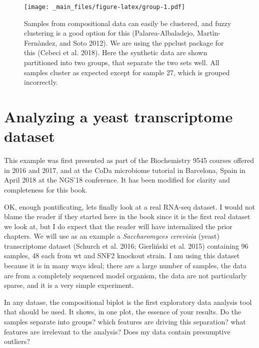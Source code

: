 \documentclass[onecolumn]{article}
\begin{document}
\begin{figure}
\centering
\texttt{[image: \_main\_files/figure-latex/group-1.pdf]}
\caption{\label{fig:group}Samples from compositional data can easily be clustered, and fuzzy clustering is a good option for this (Palarea-Albaladejo, Martìn-Fernàndez, and Soto 2012). We are using the ppclust package for this (Cebeci et al. 2018). Here the synthetic data are shown partitioned into two groups, that separate the two sets well. All samples cluster as expected except for sample 27, which is grouped incorrectly.}
\end{figure}

\hypertarget{analyzing-a-yeast-transcriptome-dataset}{%
\section{Analyzing a yeast transcriptome dataset}\label{analyzing-a-yeast-transcriptome-dataset}}

\hspace{2cm}\begin{minipage}[ct]{10cm}
\parskip=5pt
\parindent=5pt
This example was first presented as part of the Biochemistry 9545 courses offered in 2016 and 2017, and at the CoDa microbiome tutorial in Barcelona, Spain in April 2018 at the NGS'18 conference.  It has been modified for clarity and completeness for this book.
\end{minipage}
\vspace{1cm}

OK, enough pontificating, lets finally look at a real RNA-seq dataset. I would not blame the reader if they started here in the book since it is the first real dataset we look at, but I do expect that the reader will have internalized the prior chapters. We will use as an example a \emph{Saccharomyces cerevisia} (yeast) transcriptome dataset (Schurch et al. 2016; Gierliński et al. 2015) containing 96 samples, 48 each from wt and SNF2 knockout strain. I am using this dataset because it is in many ways ideal; there are a large number of samples, the data are from a completely sequenced model organism, the data are not particularly sparse, and it is a very simple experiment.

In any datase, the compositional biplot is the first exploratory data analysis tool that should be used. It shows, in one plot, the essence of your results. Do the samples separate into groups? which features are driving this separation? what features are irrelevant to the analysis? Does my data contain presumptive outliers?
\end{document}
